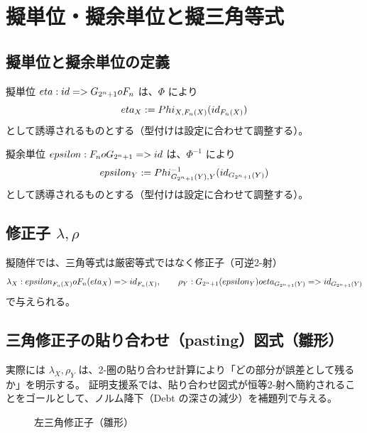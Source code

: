 \documentclass[a4paper,11pt]{article}
\begin{document}
\section{擬単位・擬余単位と擬三角等式}
\subsection{擬単位と擬余単位の定義}
\begin{definition}[擬単位]
擬単位 $eta:id => G_{2^n+1}o F_n$ は、$\Phi$ により
\[
  eta_X := Phi_{X,F_n(X)}(id_{F_n(X)})
\]
として誘導されるものとする（型付けは設定に合わせて調整する）。
\end{definition}

\begin{definition}[擬余単位]
擬余単位 $epsilon:F_no G_{2^n+1}=> id$ は、$\Phi^{-1}$ により
\[
  epsilon_Y := Phi^{-1}_{G_{2^n+1}(Y),Y}(id_{G_{2^n+1}(Y)})
\]
として誘導されるものとする（型付けは設定に合わせて調整する）。
\end{definition}

\subsection{修正子 \texorpdfstring{$\lambda,\rho$}{lambda,rho}}
\begin{definition}
擬随伴では、三角等式は厳密等式ではなく修正子（可逆2-射）
\[
  \lambda_X:epsilon_{F_n(X)}o F_n(eta_X)=> id_{F_n(X)},\qquad
  \rho_Y:G_{2^n+1}(epsilon_Y)o eta_{G_{2^n+1}(Y)}=> id_{G_{2^n+1}(Y)}
\]
で与えられる。
\end{definition}

\subsection{三角修正子の貼り合わせ（pasting）図式（雛形）}
\begin{remark}
実際には $\lambda_X,\rho_Y$ は、2-圏の貼り合わせ計算により「どの部分が誤差として残るか」を明示する。
証明支援系では、貼り合わせ図式が恒等2-射へ簡約されることをゴールとして、ノルム降下（Debt の深さの減少）を補題列で与える。
\end{remark}

\begin{figure}[ht]
\centering
{}
\caption{左三角修正子（雛形）}
\end{figure}
\end{document}
